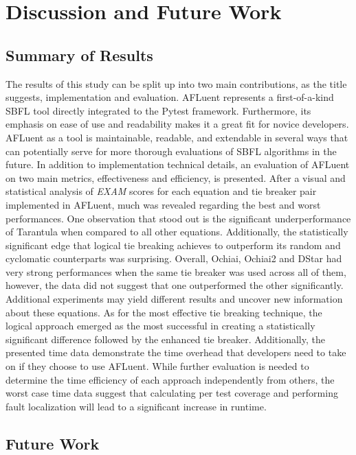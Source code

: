 \chapter{Discussion and Future Work}
\label{ch:conclusion}

\section{Summary of Results}

The results of this study can be split up into two main contributions, as the
title suggests, implementation and evaluation. AFLuent represents a first-of-a-kind SBFL tool directly integrated to the Pytest framework. Furthermore, its
emphasis on ease of use and readability makes it a great fit for
novice developers. AFLuent as a tool is maintainable, readable, and extendable
in several ways that can potentially serve for more thorough evaluations
of SBFL algorithms in the future. In addition to implementation technical
details, an evaluation of AFLuent on two main metrics, effectiveness and
efficiency, is presented. After a visual and statistical analysis of \emph{EXAM} scores for each equation
and tie breaker pair implemented in AFLuent, much was revealed regarding the
best and worst performances. One observation that stood out
is the significant underperformance of Tarantula when compared to all other
equations. Additionally, the statistically significant edge that logical tie
breaking achieves to outperform its random and cyclomatic counterparts was
surprising. Overall, Ochiai, Ochiai2 and DStar had very strong performances
when the same tie breaker was used across all of them, however, the data did not
suggest that one outperformed the other significantly. Additional experiments may
yield different results and uncover new information about these equations. As for the most effective tie breaking technique, the
logical approach emerged as the most successful in creating a statistically
significant difference followed by the enhanced tie breaker.
Additionally, the presented time data demonstrate the
time overhead that developers need to take on if they choose to use
AFLuent. While further evaluation is needed to determine the time efficiency of
each approach independently from others, the worst case time data suggest that
calculating per test coverage and performing fault localization will lead to a
significant increase in runtime.

\section{Future Work}
\label{sec:future_work}


